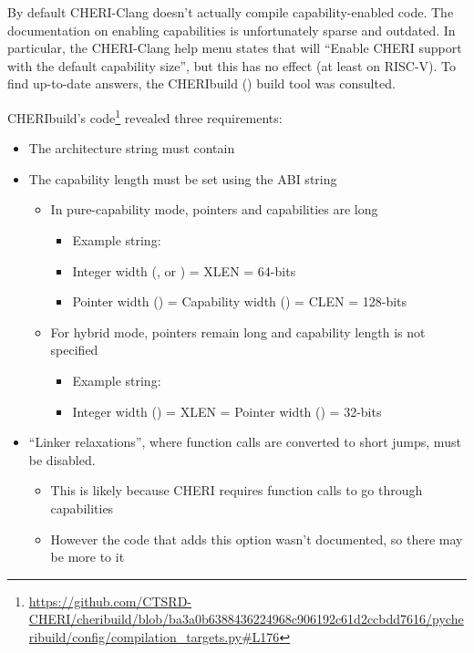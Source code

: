 By default CHERI-Clang doesn't actually compile capability-enabled code.
The documentation on enabling capabilities is unfortunately sparse and outdated.
In particular, the CHERI-Clang help menu states that  will \enquote{Enable CHERI support with the default capability size}, but this has no effect (at least on RISC-V).
To find up-to-date answers, the CHERIbuild () build tool was consulted.

CHERIbuild's code\footnote{\url{https://github.com/CTSRD-CHERI/cheribuild/blob/ba3a0b6388436224968c906192c61d2ccbdd7616/pycheribuild/config/compilation_targets.py\#L176}} revealed three requirements:
\begin{itemize}
    \item The architecture string must contain 
    \item The capability length must be set using the ABI string
    \begin{itemize}
        \item In pure-capability mode, pointers and capabilities are  long
        \begin{itemize}
            \item Example string: 
            \item Integer width (, or ) = XLEN = 64-bits
            \item Pointer width () = Capability width () = CLEN = 128-bits
        \end{itemize}
        \item For hybrid mode, pointers remain  long and capability length is not specified
        \begin{itemize}
            \item Example string: 
            \item Integer width () = XLEN = Pointer width () = 32-bits
        \end{itemize}
    \end{itemize}
    \item ``Linker relaxations'', where function calls are converted to short jumps\cite{chenCompilerSupportLinker2019}, must be disabled.
    \begin{itemize}
        \item This is likely because CHERI requires function calls to go through capabilities
        \item However the code that adds this option wasn't documented, so there may be more to it
    \end{itemize}
\end{itemize}

